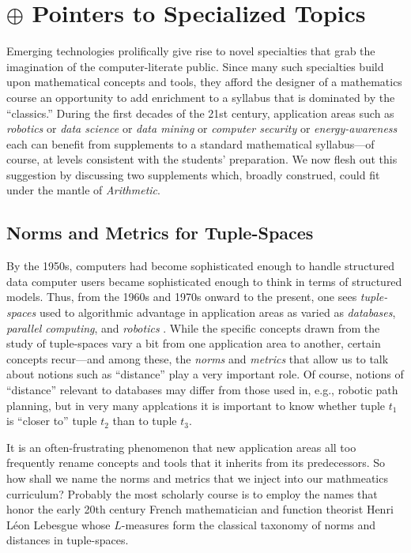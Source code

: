 \section{$\oplus$ Pointers to Specialized Topics}

Emerging technologies prolifically give rise to novel specialties that
grab the imagination of the computer-literate public.  Since many such
specialties build upon mathematical concepts and tools, they afford
the designer of a mathematics course an opportunity to add enrichment
to a syllabus that is dominated by the ``classics.''  During the first
decades of the 21st century, application areas such as {\it robotics}
or {\it data science} or {\it data mining} or {\it computer security}
or {\it energy-awareness} each can benefit from supplements to a
standard mathematical syllabus---of course, at levels consistent with
the students' preparation.  We now flesh out this suggestion by
discussing two supplements which, broadly construed, could fit under
the mantle of {\it Arithmetic}.

\subsection{Norms and Metrics for Tuple-Spaces}
\label{sec:Ln-norms}

By the 1950s, computers had become sophisticated enough to handle
structured data computer users became sophisticated enough to think in
terms of structured models.  Thus, from the 1960s and 1970s onward to
the present, one sees {\it tuple-spaces}  used to
algorithmic advantage in application areas as varied as {\it
  databases}, \cite{Codd70} {\it parallel computing},
\cite{BlumS77,Shinahr74} and {\it robotics}
\cite{Marchese96,Rosenberg12}.  While the specific concepts drawn from
the study of tuple-spaces vary a bit from one application area to
another, certain concepts recur---and among these, the {\it norms} and
{\it metrics} that allow us to talk about notions such as ``distance''
play a very important role.  Of course, notions of ``distance''
relevant to databases may differ from those used in, e.g., robotic
path planning, but in very many applcations it is important to know
whether tuple $t_1$ is ``closer to'' tuple $t_2$ than to tuple $t_3$.

It is an often-frustrating phenomenon that new application areas all
too frequently rename concepts and tools that it inherits from its
predecessors.  So how shall we name the norms and metrics that we
inject into our mathmeatics curriculum?  Probably the most scholarly
course is to employ the names that honor the early 20th century French
mathematician and function theorist Henri L\'{e}on Lebesgue
 whose $L$-measures
 form the classical taxonomy of norms
and distances in tuple-spaces.

